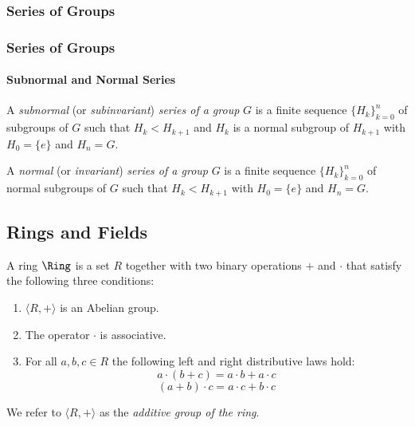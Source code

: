 {\subsubsection{Series of Groups}}
{\subsubsection{Series of Groups\protect\footnotemark} 
}
\paragraph{Subnormal and Normal Series}
\begin{definition} A \emph{subnormal} (or
\emph{subinvariant}) \emph{series of a group} $G$ is a finite sequence
$\{H_k\}_{k=0}^n$ of subgroups of $G$ such that $H_k < H_{k+1}$ and
$H_k$ is a normal subgroup of $H_{k+1}$ with $H_0=\{e\}$ and $H_n=G$.
\end{definition}
\begin{definition} A \emph{normal} (or
\emph{invariant}) \emph{series of a group} $G$ is a finite sequence
$\{H_k\}_{k=0}^n$ of normal subgroups of $G$ such that $H_k < H_{k+1}$
with $H_0=\{e\}$ and $H_n=G$. 
\end{definition}

\subsection{Rings and Fields}
\label{sec:ringsandfields}
\begin{definition}[Ring]
A ring $\Ring$ is a set $R$ together with two binary operations $+$ and
$\cdot$ that satisfy the following three conditions:
\begin{enumerate}
\item $\langle R, + \rangle$ is an Abelian group.
\item The operator $\cdot $ is associative.
\item For all $a,b,c \in R$ the following left and right distributive
laws hold:
\[
    a\cdot(b+c) = a\cdot b + a \cdot c
\]
\[
    (a + b)\cdot c = a\cdot c + b \cdot c
\]
\end{enumerate}
\end{definition}
We refer to $\langle R, + \rangle$ as the 
\emph{additive group of the ring}. 

